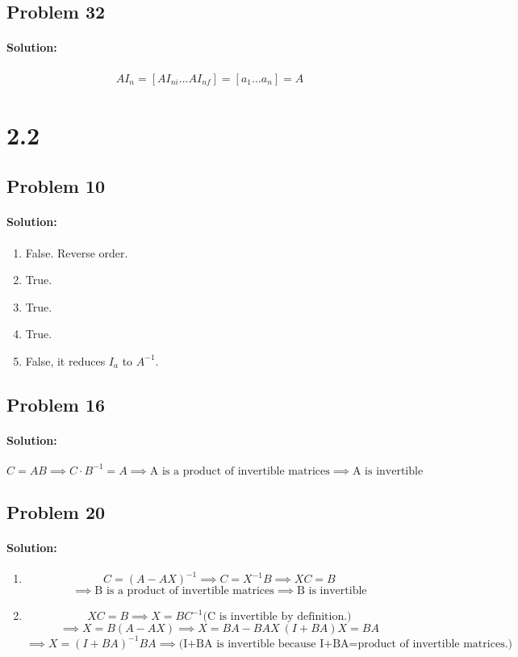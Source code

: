 \documentclass[11pt, notitlepage]{article}
\newenvironment{solution}{\paragraph{Solution:}}{\hfill}
\begin{document}
\subsection{Problem 32} 
\begin{solution}
	\begin{align*}
		AI_n=[AI_{ni} ... AI_{nf}]=[a_1 ... a_n]=A
	\end{align*}
\end{solution}

\newpage
\section{2.2} 
\subsection{Problem 10}
\begin{solution}
	\begin{enumerate}[label=\alph*.)]
		\item False. Reverse order.
		\item True.
		\item True.
		\item True.
		\item False, it reduces $I_a$ to $A^{-1}$.
	\end{enumerate}
\end{solution}
\subsection{Problem 16}
\begin{solution}
	\[ C=AB\implies C\cdot B^{-1} = A\implies \text{A is a product of invertible matrices} \implies \text{A is invertible} \]
\end{solution}
\subsection{Problem 20}
\begin{solution}
\begin{enumerate}[label=\alph*.)]
	\item \[ C=(A-AX)^{-1}\implies C=X^{-1}B \implies XC=B \]
	\[\implies \text{B is a product of invertible matrices} \implies \text{B is invertible} \]
	\item \[ XC=B \implies X=BC^{-1} \text{(C is invertible by definition.)}\]
	     \[ \implies X=B(A-AX) \implies X=BA-BAX \ (I + BA)X=BA \] 
	     \[ \implies X=(I + BA)^{-1}BA \implies \text{(I+BA is invertible because I+BA=product of invertible matrices.)} \]
\end{enumerate}
\end{solution}
\end{document}
